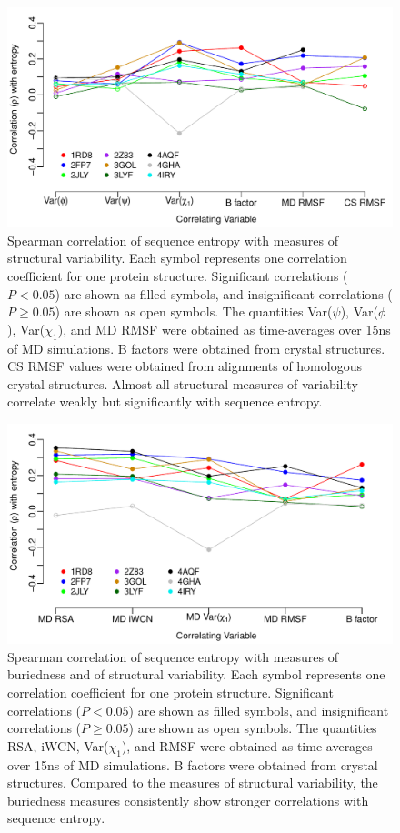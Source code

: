 \documentclass[smallextended]{svjour3}
\begin{document}
\begin{figure}[tbh]
\begin{center}
    \includegraphics[width=5in]{cor_entropy_SF.pdf}
\end{center}
\caption{Spearman correlation of sequence entropy with measures of structural variability. Each symbol represents one correlation coefficient for one protein structure. Significant correlations ($P<0.05$) are shown as filled symbols, and insignificant correlations ($P\geq0.05$) are shown as open symbols. The quantities Var($\psi$), Var($\phi$), Var($\chi_1$), and MD RMSF were obtained as time-averages over 15ns of MD simulations. B factors were obtained from crystal structures. CS RMSF values were obtained from alignments of homologous crystal structures. Almost all structural measures of variability correlate weakly but significantly with sequence entropy.}
\label{fig:cor_entropy_SF}
\end{figure}


\begin{figure}[tbh]
\begin{center}
    \includegraphics[width=5in]{cor_entropy_all.pdf}
\end{center}
\caption{Spearman correlation of sequence entropy with measures of buriedness and of structural variability. Each symbol represents one correlation coefficient for one protein structure. Significant correlations ($P<0.05$) are shown as filled symbols, and insignificant correlations ($P\geq0.05$) are shown as open symbols. The quantities RSA, iWCN, Var($\chi_1$), and RMSF were obtained as time-averages over 15ns of MD simulations. B factors were obtained from crystal structures. Compared to the measures of structural variability, the buriedness measures consistently show stronger correlations with sequence entropy.}
\label{fig:cor_entropy_all}
\end{figure}
\end{document}
